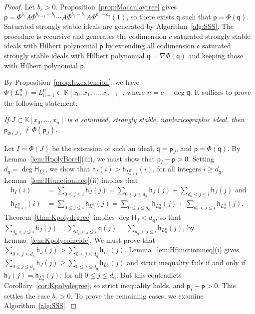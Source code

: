 \documentclass[12pt]{amsart}%
\theoremstyle{definition}%
\newcommand{\hf}{\mathsf{h}}%
\newcommand{\hp}{\mathsf{p}}%
\newcommand{\hq}{\mathsf{q}}%
\newcommand{\lift}{\Phi}%
\newcommand{\plus}{A}%
\newcommand{\hs}{\mathsf{H}}%
\newcommand{\kk}{\mathbb{K}}%
\begin{document}
\begin{proof}
  Let $b_r > 0$.  Proposition~\ref{prop:Macaulaytree} gives $\hp =
  \lift^{b_r} \plus \lift^{b_{r-1} - b_r} \dotsb \plus \lift^{b_2 -
    b_3} \plus \lift^{b_1 - b_2} (1)$, so there exists $\hq$ such that
  $\hp = \lift (\hq)$.  Saturated strongly stable ideals are generated
  by Algorithm~\ref{alg:SSS}.  The procedure is recursive and
  generates the codimension $c$ saturated strongly stable ideals with
  Hilbert polynomial $\hp$ by extending all codimension $c$ saturated
  strongly stable ideals with Hilbert polynomial $\hq = \nabla \lift
  (\hq)$ and keeping those with Hilbert polynomial $\hp$.

  By Proposition~\ref{prop:lexextension}, we have $\lift (L^{\hq}_n) =
  L^{\hp}_{n+1} \subset \kk[x_0, x_1, \dotsc, x_{n+1}]$, where $n = c
  + \deg \hq$.  It suffices to prove the following statement:

  \bigskip 
  \noindent
  \emph{If $J \subset \kk[x_0, \dotsc, x_{n}]$ is a saturated,
    strongly stable, nonlexicographic ideal, then $\hp_{\lift ( J )}
    \ne \lift (\hp_J)$.}

  \bigskip 
  \noindent 
  Let $I = \lift ( J )$ be the extension of such an ideal, $\hq =
  \hp_J$, and $\hp = \lift (\hq)$.  By
  Lemma~\ref{lem:HpolyBorel}(iii), we must show that $\hp_{I} - \hp >
  0$.  Setting $d_{\hq} = \deg \hs_{L^{\hq}_n}$, we show that
  $\hf_{I}(i) > \hf_{L^{\hp}_{n+1}}(i)$, for all integers $i \ge
  d_{\hq}$.  Lemma~\ref{lem:Hfunctionineq}(ii) implies that
  \begin{align*}
    \hf_{I}(i) &= \sum_{0 \le j \le i} \hf_J(j) = \sum_{0 \le j \le
                 d_{\hq}} \hf_J(j) + \sum_{d_{\hq} < j \le i}
                 \hf_J(j) \text{ and
                 } \\
    \hf_{L^{\hp}_{n+1}}(i) &= \sum_{0 \le j \le i}
                             \hf_{L^{\hq}_n}(j) = \sum_{0
                             \le j \le d_{\hq}} \hf_{L^{\hq}_n}(j) +
                             \sum_{d_{\hq} < j \le i} \hf_{L^{\hq}_n}(j).
  \end{align*}
  Theorem~\ref{thm:Kpolydegree} implies $\deg \hs_J < d_{\hq}$, so
  that $\sum_{d_{\hq} < j \le i} \hf_J(j) = \sum_{d_{\hq} < j \le i}
  \hq(j) = \sum_{d_{\hq} < j \le i} \hf_{L^{\hq}_n}(j)$, by
  Lemma~\ref{lem:Kpolycoincide}.  We must prove that $\sum_{0 \le j
    \le d_{\hq}} \hf_J(j) > \sum_{0 \le j \le d_{\hq}}
  \hf_{L^{\hq}_n}(j)$.  Lemma~\ref{lem:Hfunctionineq}(i) gives
  $\sum_{0 \le j \le d_{\hq}} \hf_J(j) \ge \sum_{0 \le j \le d_{\hq}}
  \hf_{L^{\hq}_n}(j)$ and strict inequality fails if and only if
  $\hf_J(j) = \hf_{L^{\hq}_n}(j)$, for all $0 \le j \le d_{\hq}$.  But
  this contradicts Corollary~\ref{cor:Kpolydegree}, so strict
  inequality holds, and $\hp_{I} - \hp > 0$.  This settles the case
  $b_r > 0$.  To prove the remaining cases, we examine
  Algorithm~\ref{alg:SSS}.
    

\end{proof}
\end{document}
